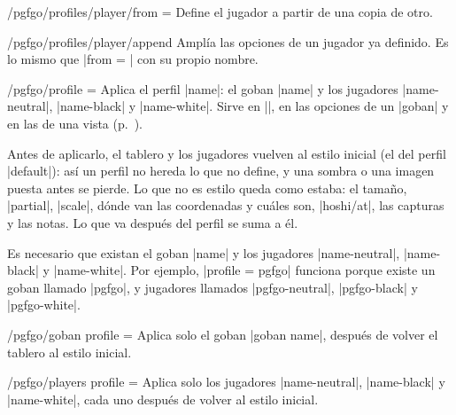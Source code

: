 \begin{goban}[9, stone = {radius = 4pt}, mark = {line = {color = red}}]
\begin{command}{\pgfgodefineplayer{}}
	\begin{key}{/pgfgo/profiles/player/from = }
		Define el jugador a partir de una copia de otro.
	\end{key}

	\begin{key}{/pgfgo/profiles/player/append}
		Amplía las opciones de un jugador ya definido. Es lo mismo que |from = | con su propio nombre.
	\end{key}
\end{command}

\begin{key}{/pgfgo/profile = }
	Aplica el perfil |name|: el goban |name| y los jugadores |name-neutral|, |name-black| y |name-white|. Sirve en |\pgfgoset|, en las opciones de un |goban| y en las de una vista (p.~\pageref{subsec:vistas}).

	Antes de aplicarlo, el tablero y los jugadores vuelven al estilo inicial (el del perfil |default|): así un perfil no hereda lo que no define, y una sombra o una imagen puesta antes se pierde. Lo que no es estilo queda como estaba: el tamaño, |partial|, |scale|, dónde van las coordenadas y cuáles son, |hoshi/at|, las capturas y las notas. Lo que va después del perfil se suma a él.

	\begin{codeexample}[width=3cm]
		\begin{goban}[3, profile = default]
		\end{goban}
	\end{codeexample}

	Es necesario que existan el goban |name| y los jugadores |name-neutral|, |name-black| y |name-white|. Por ejemplo, |profile = pgfgo| funciona porque existe un goban llamado |pgfgo|, y jugadores llamados |pgfgo-neutral|, |pgfgo-black| y |pgfgo-white|.
\end{key}

\begin{key}{/pgfgo/goban profile = }
	Aplica solo el goban |goban name|, después de volver el tablero al estilo inicial.
\end{key}

\begin{key}{/pgfgo/players profile = }
	Aplica solo los jugadores |name-neutral|, |name-black| y |name-white|, cada uno después de volver al estilo inicial.

	\begin{codeexample}[]
		\begin{goban}[3, goban profile = pgfgo]
		\end{goban}


\end{codeexample}
\end{key}
\end{goban}
